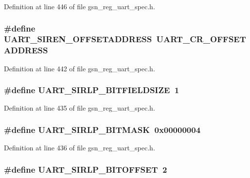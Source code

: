 Definition at line 446 of file gsn\_\-reg\_\-uart\_\-spec.h.

\hypertarget{a00575_a94e4e72847e92a8efdaf2461ed9ab22f}{
\subsubsection[{UART\_\-SIREN\_\-OFFSETADDRESS}]{\setlength{\rightskip}{0pt plus 5cm}\#define UART\_\-SIREN\_\-OFFSETADDRESS~UART\_\-CR\_\-OFFSETADDRESS}}
\label{a00575_a94e4e72847e92a8efdaf2461ed9ab22f}


Definition at line 442 of file gsn\_\-reg\_\-uart\_\-spec.h.

\hypertarget{a00575_acffafe5b41b0c0fc42411874002890b3}{
\subsubsection[{UART\_\-SIRLP\_\-BITFIELDSIZE}]{\setlength{\rightskip}{0pt plus 5cm}\#define UART\_\-SIRLP\_\-BITFIELDSIZE~1}}
\label{a00575_acffafe5b41b0c0fc42411874002890b3}


Definition at line 435 of file gsn\_\-reg\_\-uart\_\-spec.h.

\hypertarget{a00575_a10e76a0ad44d3d0bc4fe73fafa6b0fe6}{
\subsubsection[{UART\_\-SIRLP\_\-BITMASK}]{\setlength{\rightskip}{0pt plus 5cm}\#define UART\_\-SIRLP\_\-BITMASK~0x00000004}}
\label{a00575_a10e76a0ad44d3d0bc4fe73fafa6b0fe6}


Definition at line 436 of file gsn\_\-reg\_\-uart\_\-spec.h.

\hypertarget{a00575_aa80117bfee580e8c56c2321dceb19725}{
\subsubsection[{UART\_\-SIRLP\_\-BITOFFSET}]{\setlength{\rightskip}{0pt plus 5cm}\#define UART\_\-SIRLP\_\-BITOFFSET~2}}
\label{a00575_aa80117bfee580e8c56c2321dceb19725}


